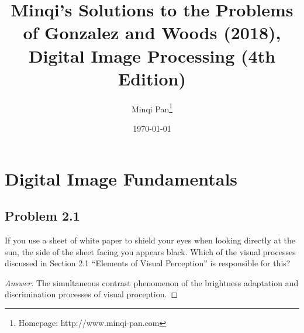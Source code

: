 \documentclass{amsbook}
\theoremstyle{definition}
\theoremstyle{remark}
\numberwithin{section}{chapter}
\numberwithin{equation}{chapter}
\begin{document}
\setcounter{chapter}{1}

\frontmatter

\title{Minqi's Solutions to the Problems of Gonzalez and Woods (2018), Digital Image Processing (4th Edition)}

\author{Minqi Pan\footnote{Homepage: http://www.minqi-pan.com}}

\date{\today}

\maketitle

\setcounter{page}{4}

\tableofcontents

\mainmatter

\chapter{Digital Image Fundamentals}
\section{Problem 2.1}
If you use a sheet of white paper to shield your eyes
when looking directly at the sun, the side of
the sheet facing you appears black. Which of the visual
processes discussed in Section 2.1 ``Elements of Visual Perception'' is responsible for this?
\begin{proof}[Answer]
The simultaneous contrast phenomenon of the brightness adaptation and discrimination processes of visual proception.
\end{proof}
\end{document}
